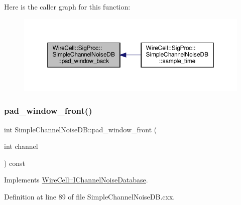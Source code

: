 Here is the caller graph for this function\+:
\nopagebreak
\begin{figure}[H]
\begin{center}
\leavevmode
\includegraphics[width=350pt]{class_wire_cell_1_1_sig_proc_1_1_simple_channel_noise_d_b_a4643919d65336ba0090213d772bb6bf9_icgraph}
\end{center}
\end{figure}
\mbox{\label{class_wire_cell_1_1_sig_proc_1_1_simple_channel_noise_d_b_a5c1e58cf0586ac32c1e6d3810606a992}} 
\subsubsection{\texorpdfstring{pad\+\_\+window\+\_\+front()}{pad\_window\_front()}}
{\footnotesize\ttfamily int Simple\+Channel\+Noise\+D\+B\+::pad\+\_\+window\+\_\+front (\begin{DoxyParamCaption}\item[{int}]{channel }\end{DoxyParamCaption}) const\hspace{0.3cm}{\ttfamily [virtual]}}



Implements \hyperlink{class_wire_cell_1_1_i_channel_noise_database_a77f82280942595e1a2506f49a6f76f56}{Wire\+Cell\+::\+I\+Channel\+Noise\+Database}.



Definition at line 89 of file Simple\+Channel\+Noise\+D\+B.\+cxx.

